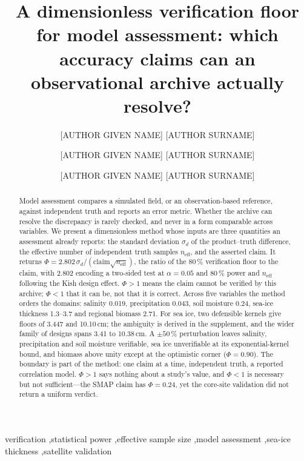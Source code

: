 \documentclass[preprint,12pt,authoryear]{elsarticle}
\begin{document}
\begin{frontmatter}

\title{A dimensionless verification floor for model assessment: which accuracy claims can an observational archive actually resolve?}

\author[1]{[AUTHOR GIVEN NAME] [AUTHOR SURNAME]}
\author[1]{[AUTHOR GIVEN NAME] [AUTHOR SURNAME]}
\author[2]{[AUTHOR GIVEN NAME] [AUTHOR SURNAME]}



\begin{abstract}
Model assessment compares a simulated field, or an observation-based reference, against independent truth and reports an error metric. Whether the archive can resolve the discrepancy is rarely checked, and never in a form comparable across variables. We present a dimensionless method whose inputs are three quantities an assessment already reports: the standard deviation $\sigma_d$ of the product--truth difference, the effective number of independent truth samples $n_{\mathrm{eff}}$, and the asserted claim. It returns $\Phi = 2.802\,\sigma_d/(\mathrm{claim}\sqrt{n_{\mathrm{eff}}})$, the ratio of the 80\,\% verification floor to the claim, with 2.802 encoding a two-sided test at $\alpha = 0.05$ and 80\,\% power and $n_{\mathrm{eff}}$ following the Kish design effect. $\Phi>1$ means the claim cannot be verified by this archive; $\Phi<1$ that it can be, not that it is correct. Across five variables the method orders the domains: salinity 0.019, precipitation 0.043, soil moisture 0.24, sea-ice thickness 1.3--3.7 and regional biomass 2.71. For sea ice, two defensible kernels give floors of 3.447 and 10.10\,cm; the ambiguity is derived in the supplement, and the wider family of designs spans 3.41 to 10.38\,cm. A $\pm 50$\,\% perturbation leaves salinity, precipitation and soil moisture verifiable, sea ice unverifiable at its exponential-kernel bound, and biomass above unity except at the optimistic corner ($\Phi = 0.90$). The boundary is part of the method: one claim at a time, independent truth, a reported correlation model. $\Phi>1$ says nothing about a study's value, and $\Phi<1$ is necessary but not sufficient---the SMAP claim has $\Phi = 0.24$, yet the core-site validation did not return a uniform verdict.
\end{abstract}

\begin{keyword}
verification \sep statistical power \sep effective sample size \sep model assessment \sep sea-ice thickness \sep satellite validation
\end{keyword}

\end{frontmatter}
\end{document}
